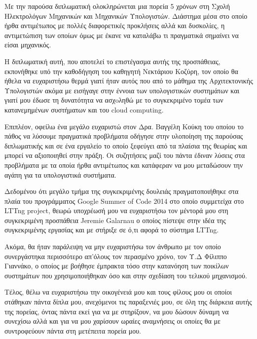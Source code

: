 \begin{acknowledgementsgr}
Με την παρούσα διπλωματική ολοκληρώνεται μια πορεία 5 χρόνων στη Σχολή
Ηλεκτρολόγων Μηχανικών και Μηχανικών Υπολογιστών. Διάστημα μέσα στο οποίο ήρθα
αντιμέτωπος με πολλές διαφορετικές προκλήσεις αλλά και δυσκολίες, η αντιμετώπιση
των οποίων όμως με έκανε να καταλάβω τι πραγματικά σημαίνει να είσαι μηχανικός.

Η διπλωματική αυτή, που αποτελεί το επιστέγασμα αυτής της προσπάθειας,
εκπονήθηκε υπό την καθοδήγηση του καθηγητή Νεκτάριου Κοζύρη, τον οποίο θα ήθελα
να ευχαριστήσω θερμά γιατί ήταν αυτός που από το μάθημα της Αρχιτεκτονικής
Υπολογιστών ακόμα με εισήγαγε στην έννοια των υπολογιστικών συστημάτων και γιατί
μου έδωσε τη δυνατότητα να ασχoληθώ με το συγκεκριμένο τομέα των κατανεμημένων
συστήματων και του cloud computing. 

Επιπλέον, οφείλω ένα μεγάλο ευχαριστώ στον Δρα. Βαγγέλη Κούκη του οποίου το
πάθος να λύσουμε πραγματικά προβλήματα οδήγησε στην υλοποίηση της παρούσας
διπλωματικής και σε ένα εργαλείο το οποίο ξεφεύγει από τα πλαίσια της θεωρίας
και μπορεί να αξιοποιηθεί στην πράξη. Οι συζητήσεις μαζί του πάντα έδιναν λύσεις
στα προβλήματα με τα οποία ήρθα αντιμέτωπος και κατάφεραν να μου μεταδώσουν την
αγάπη για τα υπολογιστικά συστήματα.

Δεδομένου ότι μεγάλο τμήμα της συγκεκριμένης δουλειάς πραγματοποιήθηκε στα
πλαία του προγράμματος Google Summer of Code 2014 στο οποίο συμμετείχα στο
LTTng project, θεωρώ υποχρέωσή μου να ευχαριστήσω τον μέντορά μου στη
συγκεκριμένη προσπάθεια Jeremie Galarnau ο οποίος πίστεψε στην ιδέα της
συγκεκριμένης εργασίας και με στήριξε σε ό,τι αφορά το σύστημα LTTng.

Ακόμα, θα ήταν παράλειψη να μην ευχαριστήσω τον άνθρωπο με τον οποίο
συνεργάστηκα περισσότερο απ'όλους τον περασμένο χρόνο, τον Υ.Δ Φίλιππο Γιαννάκο,
ο οποίος με βοήθησε έμπρακτα τόσο στην κατανόηση των ποικίλων συστημάτων που
χρησιμοποιήθηκαν όσο και στην σχεδίαση του τελικού μηχανισμού.

Tέλος, θέλω να ευχαριστήσω την οικογένειά μου και τους φίλους μου οι οποίοι
στάθηκαν πάντα δίπλα μου, ανεχόμενοι τις παραξενιές μου, σε όλη της διάρκεια
αυτής της πορείας, όντας πάντα εκεί για να με στηρίξουν, να μου δώσουν δύναμη
να συνεχίσω αλλά και για να μου χαρίσουν ωραίες αναμνήσεις οι οποίες θα με
συντροφεύουν πάντα στη μετέπειτα πορεία μου.
\end{acknowledgementsgr}
